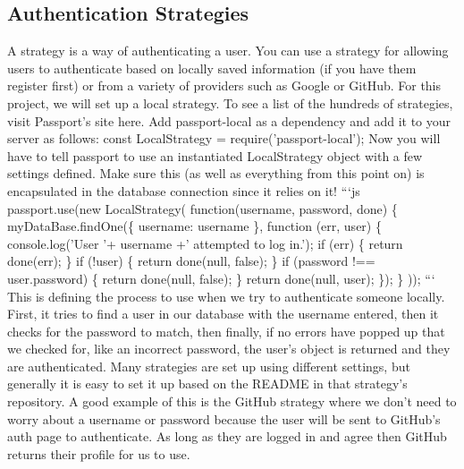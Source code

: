 \documentclass{article}%
\begin{document}
%
\subsection{Authentication Strategies}%
\label{subsec:AuthenticationStrategies}%
A strategy is a way of authenticating a user. You can use a strategy for allowing users to authenticate based on locally saved information (if you have them register first) or from a variety of providers such as Google or GitHub. For this project, we will set up a local strategy. To see a list of the hundreds of strategies, visit Passport's site here.\newline%
Add passport{-}local as a dependency and add it to your server as follows: const LocalStrategy = require('passport{-}local');\newline%
Now you will have to tell passport to use an instantiated LocalStrategy object with a few settings defined. Make sure this (as well as everything from this point on) is encapsulated in the database connection since it relies on it!\newline%
```js\newline%
passport.use(new LocalStrategy(\newline%
  function(username, password, done) \{\newline%
    myDataBase.findOne(\{ username: username \}, function (err, user) \{\newline%
      console.log('User '+ username +' attempted to log in.');\newline%
      if (err) \{ return done(err); \}\newline%
      if (!user) \{ return done(null, false); \}\newline%
      if (password !== user.password) \{ return done(null, false); \}\newline%
      return done(null, user);\newline%
    \});\newline%
  \}\newline%
));\newline%
```\newline%
This is defining the process to use when we try to authenticate someone locally. First, it tries to find a user in our database with the username entered, then it checks for the password to match, then finally, if no errors have popped up that we checked for, like an incorrect password, the user's object is returned and they are authenticated.\newline%
Many strategies are set up using different settings, but generally it is easy to set it up based on the README in that strategy's repository. A good example of this is the GitHub strategy where we don't need to worry about a username or password because the user will be sent to GitHub's auth page to authenticate. As long as they are logged in and agree then GitHub returns their profile for us to use.\newline%
\end{document}
